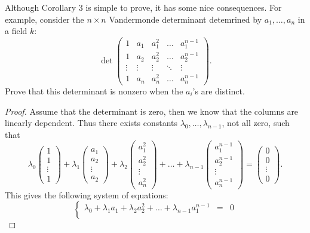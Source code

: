 \begin{exercise}{2}
Although Corollary $3$ is simple to prove, it has some nice consequences. For example, consider the $n\times n$ Vandermonde determinant detemrined by $a_1,\dots,a_n$ in a field $k$:
$$\det\left(\begin{array}{ccccc}
1 & a_1 & a_1^2 & \hdots & a_1^{n-1}\\
1 & a_2 & a_2^2 & \hdots & a_2^{n-1}\\
\vdots & \vdots & \vdots & \ddots & \vdots\\
1 & a_n & a_n^2 & \hdots & a_n^{n-1}
\end{array}\right).$$
Prove that this determinant is nonzero when the $a_i$'s are distinct.
\end{exercise}
\begin{proof}
    Assume that the determinant is zero, then we know that the columns are linearly dependent. Thus there exists constants $\lambda_0,\dots,\lambda_{n-1}$, not all zero, such that
    $$\lambda_0\left(\begin{array}{c} 1\\ 1\\ \vdots\\ 1\end{array}\right) + \lambda_1\left(\begin{array}{c} a_1\\ a_2\\ \vdots\\ a_2\end{array}\right) + \lambda_2\left(\begin{array}{c} a_1^2\\ a_2^2\\ \vdots\\ a_n^2\end{array}\right) + \hdots + \lambda_{n-1}\left(\begin{array}{c} a_1^{n-1}\\ a_2^{n-1}\\ \vdots\\ a_n^{n-1}\end{array}\right) = \left(\begin{array}{c} 0\\ 0\\ \vdots\\ 0\end{array}\right).$$
    This gives the following system of equations:
    $$\left\{\begin{array}{lll}
    \lambda_0 + \lambda_1 a_1 + \lambda_2 a_2^2 + \hdots + \lambda_{n-1} a_1^{n-1} & = & 0\\

\end{array}$$
\end{proof}
